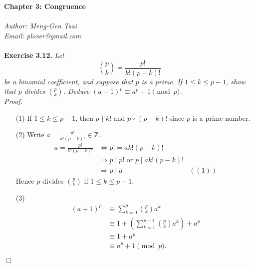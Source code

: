 \documentclass{article}
\begin{document}
\textbf{\Large Chapter 3: Congruence} \\\\



\emph{Author: Meng-Gen Tsai} \\
\emph{Email: plover@gmail.com} \\\\






\textbf{Exercise 3.12.}
\emph{Let $${p \choose k} = \frac{p!}{k!(p-k)!}$$
be a binomial coefficient, and suppose that $p$ is a prime.
If $1 \leq k \leq p-1$, show that $p$ divides ${p \choose k}$.
Deduce $(a+1)^p \equiv a^p + 1 \pmod{p}$.} \\

\emph{Proof.}
\begin{enumerate}
  \item[(1)]
  If $1 \leq k \leq p-1$, then $p \nmid k!$ and $p \nmid (p-k)!$
  since $p$ is a prime number.
  \item[(2)]
  Write $a = \frac{p!}{k!(p-k)!} \in \mathbb{Z}$.
  \begin{align*}
  a = \frac{p!}{k!(p-k)!}
  &\Longleftrightarrow
  p! = ak!(p-k)! \\
  &\Longrightarrow
  p \mid p! \text{ or } p \mid ak!(p-k)! \\
  &\Longrightarrow
  p \mid a
    &((1))
  \end{align*}
  Hence $p$ divides ${p \choose k}$ if $1 \leq k \leq p-1$.
  \item[(3)]
  \begin{align*}
  (a+1)^p
  &\equiv \sum_{k=0}^{p} {p \choose k} a^k \\
  &\equiv 1 + \left( \sum_{k=1}^{p-1} {p \choose k} a^k \right) + a^p \\
  &\equiv 1 + a^p \\
  &\equiv a^p + 1 \pmod{p}.
  \end{align*}
\end{enumerate}
$\Box$\\\\



\end{document}
